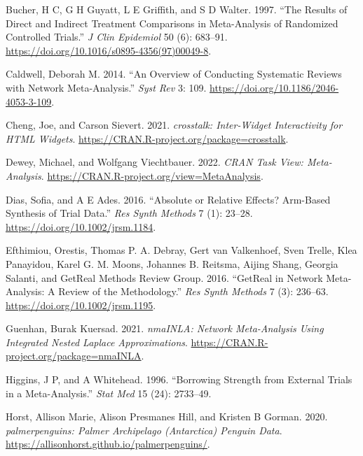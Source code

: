 \hypertarget{refs}{}
\begin{CSLReferences}{1}{0}
\leavevmode{}%
Bucher, H C, G H Guyatt, L E Griffith, and S D Walter. 1997. {``The Results of Direct and Indirect Treatment Comparisons in Meta-Analysis of Randomized Controlled Trials.''} \emph{J Clin Epidemiol} 50 (6): 683--91. \url{https://doi.org/10.1016/s0895-4356(97)00049-8}.

\leavevmode{}%
Caldwell, Deborah M. 2014. {``An Overview of Conducting Systematic Reviews with Network Meta-Analysis.''} \emph{Syst Rev} 3: 109. \url{https://doi.org/10.1186/2046-4053-3-109}.

\leavevmode{}%
Cheng, Joe, and Carson Sievert. 2021. \emph{{crosstalk}: Inter-Widget Interactivity for HTML Widgets}. \url{https://CRAN.R-project.org/package=crosstalk}.

\leavevmode{}%
Dewey, Michael, and Wolfgang Viechtbauer. 2022. \emph{{CRAN Task View}: Meta-Analysis}. \url{https://CRAN.R-project.org/view=MetaAnalysis}.

\leavevmode{}%
Dias, Sofia, and A E Ades. 2016. {``Absolute or Relative Effects? Arm-Based Synthesis of Trial Data.''} \emph{Res Synth Methods} 7 (1): 23--28. \url{https://doi.org/10.1002/jrsm.1184}.

\leavevmode{}%
Efthimiou, Orestis, Thomas P. A. Debray, Gert van Valkenhoef, Sven Trelle, Klea Panayidou, Karel G. M. Moons, Johannes B. Reitsma, Aijing Shang, Georgia Salanti, and GetReal Methods Review Group. 2016. {``GetReal in Network Meta-Analysis: A Review of the Methodology.''} \emph{Res Synth Methods} 7 (3): 236--63. \url{https://doi.org/10.1002/jrsm.1195}.

\leavevmode{}%
Guenhan, Burak Kuersad. 2021. \emph{nmaINLA: Network Meta-Analysis Using Integrated Nested Laplace Approximations}. \url{https://CRAN.R-project.org/package=nmaINLA}.

\leavevmode{}%
Higgins, J P, and A Whitehead. 1996. {``Borrowing Strength from External Trials in a Meta-Analysis.''} \emph{Stat Med} 15 (24): 2733--49.

\leavevmode{}%
Horst, Allison Marie, Alison Presmanes Hill, and Kristen B Gorman. 2020. \emph{{palmerpenguins}: Palmer Archipelago (Antarctica) Penguin Data}. \url{https://allisonhorst.github.io/palmerpenguins/}.


\end{CSLReferences}
